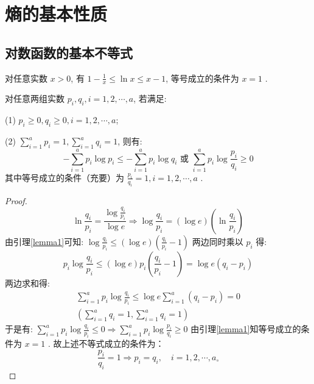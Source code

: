 \section{熵的基本性质}
\subsection{对数函数的基本不等式}
\begin{lemma}\label{lemma1}
对任意实数 $ x>0 $, 有 $ 1-\frac{1}{x} \leqslant \ln x \leqslant x-1 $, 等号成立的条件为 $ x=1 $ .
\end{lemma}

\begin{lemma}\label{lamma2}
对任意两组实数 $ p_{i}, q_{i}, i=1,2, \cdots, a $, 若满足:

(1) $ p_{i} \geqslant 0, q_{i} \geqslant 0, i=1,2, \cdots, a $;

(2) $ \sum\limits_{i=1}^{a} p_{i}=1, \sum\limits_{i=1}^{a} q_{i}=1 $, 则有:
$$
-\sum_{i=1}^{a} p_{i} \log p_{i} \leqslant-\sum_{i=1}^{a} p_{i} \log q_{i} \text { 或 } \sum_{i=1}^{a} p_{i} \log \frac{p_{i}}{q_{i}} \geqslant 0
$$
其中等号成立的条件（充要）为 $ \frac{p_{i}}{q_{i}}=1, i=1,2, \cdots, a $ .
\end{lemma}
\begin{proof}
$$ \ln \frac{q_{i}}{p_{i}}=\frac{\log \frac{q_{i}}{p_{i}}}{\log e} \Rightarrow \log \frac{q_{i}}{p_{i}}=(\log e)\left(\ln \frac{q_{i}}{p_{i}}\right) $$
由引理\ref{lemma1}可知: $ \log \frac{q_{i}}{p_{i}} \leqslant(\log e)\left(\frac{q_{i}}{p_{i}}-1\right) $
两边同时乘以 $ p_{i} $ 得:
$$
p_{i} \log \frac{q_{i}}{p_{i}} \leqslant(\log e) p_{i}\left(\frac{q_{i}}{p_{i}}-1\right)=\log e\left(q_{i}-p_{i}\right)
$$
两边求和得:
$$
\begin{array}{c}
\sum\limits_{i=1}^{a} p_{i} \log \frac{q_{i}}{p_{i}} \leqslant \log e \sum\limits_{i=1}^{a}\left(q_{i}-p_{i}\right)=0 \\
\left(\sum\limits_{i=1}^{a} q_{i}=1, \sum\limits_{i=1}^{a} q_{i}=1\right)
\end{array}
$$
于是有: $ \sum\limits_{i=1}^{a} p_{i} \log \frac{q_{i}}{p_{i}} \leqslant 0 \Rightarrow \sum\limits_{i=1}^{a} p_{i} \log \frac{p_{i}}{q_{i}} \geqslant 0 $
由引理\ref{lemma1}知等号成立的条件为 $ x=1 $ . 故上述不等式成立的条件为：
$$
\frac{p_{i}}{q_{i}}=1 \Rightarrow p_{i}=q_{i}, \quad i=1,2, \cdots, a_{\circ}
$$
\end{proof}

